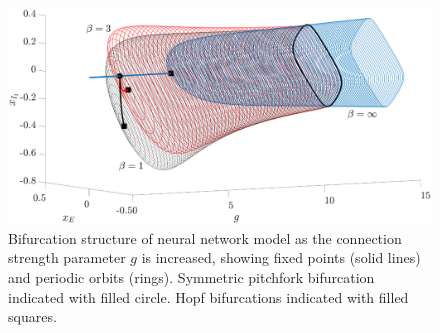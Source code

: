\documentclass[12pt,reqno,oneside,hidelinks]{article}
\begin{document}
\begin{figure}
    \centering
    \includegraphics[width=14cm]{images/pitchbif.eps}
    \caption{Bifurcation structure of neural network model as the connection strength parameter $g$ is increased, showing fixed points (solid lines) and periodic orbits (rings). Symmetric pitchfork bifurcation indicated with filled circle. Hopf bifurcations indicated with filled squares.}
    \label{fig:neuroBD}
\end{figure}

\end{document}
